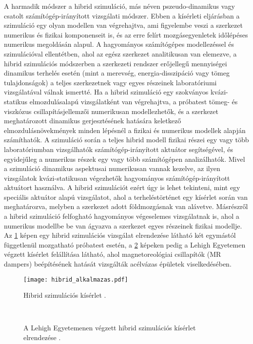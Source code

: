 A harmadik módszer a hibrid szimuláció, más néven pszeudo-dinamikus vagy csatolt számítógép-irányított vizsgálati módszer. Ebben a  kísérleti eljárásban a szimuláció egy olyan modellen van végrehajtva, ami figyelembe veszi a szerkezet numerikus és fizikai komponenseit is, és az erre felírt mozgásegyenletek  időlépéses numerikus megoldásán alapul. A hagyományos számítógépes modellezéssel és szimulációval ellentétben, ahol az egész szerkezet analitikusan van elemezve, a hibrid szimulációs módszerben  a szerkezeti rendszer erőjellegű mennyiségei dinamikus terhelés esetén (mint a merevség, energia-disszipáció vagy tömeg tulajdonságok)  a teljes szerkezetnek vagy egyes részeinek laboratóriumi vizsgálatával válnak ismertté. Ha a hibrid szimuláció egy szokványos kvázi-statikus elmozdulásalapú vizsgálatként van végrehajtva, a próbatest tömeg- és viszkózus csillapításjellemzői numerikusan modellezhetők, és a szerkezet meghatározott dinamikus gerjesztésének hatására keletkező elmozdulásnövekmények minden lépésnél a fizikai és numerikus modellek alapján számíthatók. A szimuláció során a teljes hibrid modell fizikai részei egy vagy több laboratóriumban vizsgálhatók számítógép-irányított aktuátor segítségével, és egyidejűleg a numerikus részek egy vagy több számítógépen analizálhatók. Mivel a szimuláció dinamikus aspektusai numerikusan vannak kezelve, az ilyen vizsgálatok kvázi-statikusan végezhetők hagyományos számítógép-irányított aktuátort használva. A hibrid szimulációt ezért úgy is lehet tekinteni, mint egy speciális aktuátor alapú vizsgálatot, ahol a terheléstörténet egy kísérlet során van meghatározva, melyben a szerkezet adott földmozgásnak van alávetve. Másrészről a hibrid szimuláció felfogható hagyományos végeselemes vizsgálatnak is, ahol a numerikus modellbe be van ágyazva a szerkezet egyes részeinek fizikai modellje. Az \ref{fig:hibridkep} képen egy hibrid szimulációs vizsgálat elrendezése látható két egymástól függetlenül mozgatható próbatest esetén, a \ref{fig:lehigh_szerk} képeken  pedig a Lehigh Egyetemen végzett kísérlet felállítása látható, ahol   magnetoreológiai csillapítók (MR dampers) beépítésének hatását vizsgálták acélvázas épületek viselkedésében.

\begin{figure}[h!bt]
\centering
\texttt{[image: hibrid\_alkalmazas.pdf]}
\caption{Hibrid szimulációs kísérlet \cite{hibrid}.}
\label{fig:hibridkep}
\end{figure}


\begin{figure}[p]%
\centering
{}%
\\
%
\caption[A Lehigh Egyetemenen végzett hibrid szimulációs kísérlet.]{A Lehigh Egyetemenen végzett hibrid szimulációs kísérlet elrendezése \cite{lehigh}.}
\label{fig:lehigh_szerk}%
\end{figure}


